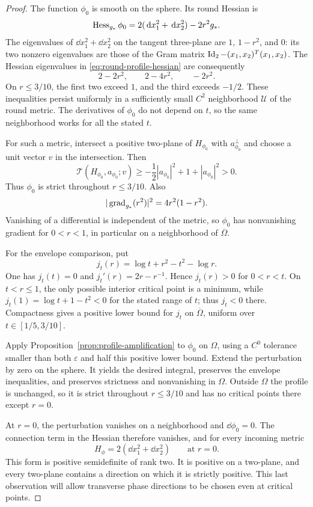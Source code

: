 \begin{proof}
The function $\phi_0$ is smooth on the sphere.  Its round Hessian is
\begin{equation}
 \operatorname{Hess}_{g_*}\phi_0
 =2(\,\mathrm d x_1^2+\,\mathrm d x_2^2)-2r^2g_*.
 \label{eq:round-profile-hessian}
\end{equation}
The eigenvalues of $\dd x_1^2+\dd x_2^2$ on the tangent three-plane are
$1$, $1-r^2$, and $0$: its two nonzero eigenvalues are those of the Gram
matrix $\operatorname{Id}_2-(x_1,x_2)^T(x_1,x_2)$.  The Hessian eigenvalues in
\eqref{eq:round-profile-hessian} are consequently
\[
 2-2r^2,\qquad 2-4r^2,\qquad -2r^2.
\]
On $r\le3/10$, the first two exceed $1$, and the third exceeds $-1/2$.
These inequalities persist uniformly in a sufficiently small $C^2$
neighborhood $\mathcal U$ of the round metric.  The derivatives of
$\phi_0$ do not depend on $t$, so the same neighborhood works for all
the stated $t$.

For such a metric, intersect a positive two-plane of $H_{\phi_0}$ with
$a_{\phi_0}^\perp$ and choose a unit vector $v$ in the intersection.
Then
\[
 \mathcal T(H_{\phi_0},a_{\phi_0};v)
 \ge-\frac12|a_{\phi_0}|^2+1+|a_{\phi_0}|^2>0.
\]
Thus $\phi_0$ is strict throughout $r\le3/10$.  Also
\[
 |\operatorname{grad}_{g_*}(r^2)|^2=4r^2(1-r^2).
\]
Vanishing of a differential is independent of the metric, so $\phi_0$
has nonvanishing gradient for $0<r<1$, in particular on a neighborhood of
$\overline\Omega$.

For the envelope comparison, put
\[
 j_t(r)=\log t+r^2-t^2-\log r.
\]
One has $j_t(t)=0$ and $j_t'(r)=2r-r^{-1}$.  Hence $j_t(r)>0$ for
$0<r<t$.  On $t<r\le1$, the only possible interior critical point is a
minimum, while
$j_t(1)=\log t+1-t^2<0$ for the stated range of $t$; thus $j_t<0$ there.
Compactness gives a positive lower bound for $j_t$ on
$\overline\Omega$, uniform over $t\in[1/5,3/10]$.

Apply Proposition~\ref{prop:profile-amplification} to $\phi_0$ on
$\Omega$, using a $C^0$ tolerance smaller than both $\varepsilon$ and
half this positive lower bound.  Extend the perturbation by zero on the
sphere.  It yields the desired integral, preserves the envelope
inequalities, and preserves strictness and nonvanishing in $\Omega$.
Outside $\Omega$ the profile is unchanged, so it is strict throughout
$r\le3/10$ and has no critical points there except $r=0$.

At $r=0$, the perturbation vanishes on a neighborhood and
$\dd\phi_0=0$.  The connection term in the Hessian therefore vanishes,
and for every incoming metric
\[
 H_\phi=2(\dd x_1^2+\dd x_2^2)
 \qquad\text{at }r=0.
\]
This form is positive semidefinite of rank two.  It is positive on a
two-plane, and every two-plane contains a direction on which it is
strictly positive.  This last observation will allow transverse phase
directions to be chosen even at critical points.


\end{proof}
